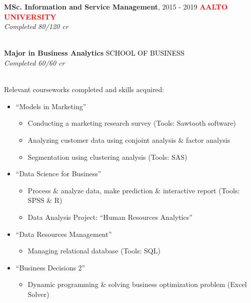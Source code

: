 \documentclass[letterpaper]{twentysecondcv} %
\begin{document}
	\textbf{MSc. Information and Service Management}, 2015 - 2019%
	\hfill%
	\textcolor{red}{\bfseries\MakeUppercase{Aalto University}} \\%
	\textit{\small Completed 80/120 cr}
	\hfill
	\\
	\textbf{Major in Business Analytics}%
	\hfill%
	\textcolor{black}{\MakeUppercase{School of Business}} \\
	\textit{\small Completed 60/60 cr}
	\hfill
	\\
	Relevant courseworks completed and skills acquired: 
	\begin{itemize}[noitemsep]
			\item “Models in Marketing”
			\begin{itemize}
				\item Conducting a marketing research survey (Tools: Sawtooth software) 
				\item Analyzing customer data using conjoint analysis \& factor analysis
				\item Segmentation using clustering analysis (Tools: SAS)
			\end{itemize}
			\item “Data Science for Business”
			\begin{itemize}
				\item Process \& analyze data, make prediction \& interactive report (Tools: SPSS \& R)
				\item Data Analysis Project: “Human Resources Analytics”
			\end{itemize}
			\item “Data Resources Management”
			\begin{itemize}
				\item Managing relational database (Tools: SQL)
			\end{itemize}
					\item  “Business Decisions 2”
		\begin{itemize}
			\item Dynamic programming \& solving business optimization problem (Excel Solver)
		\end{itemize}
	\end{itemize} 
\end{document}
